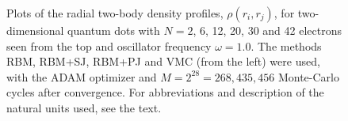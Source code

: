 \begin{landscape}
\begin{figure}
		\hspace{0.1cm}
		
		\caption{Plots of the radial two-body density profiles, $\rho(r_i, r_j)$, for two-dimensional quantum dots with $N=2$, 6, 12, 20, 30 and 42 electrons seen from the top and oscillator frequency $\omega=1.0$. The methods RBM, RBM+SJ, RBM+PJ and VMC (from the left) were used, with the ADAM optimizer and $M=2^{28}=268,435,456$ Monte-Carlo cycles after convergence. For abbreviations and description of the natural units used, see the text.}%
		\label{fig:TB_2D_1p0w}
	\end{figure}
\end{landscape}

